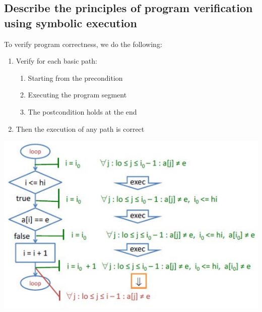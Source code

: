 \documentclass{article}
\begin{document}
\subsection{Describe the principles of program verification using symbolic execution}
\noindent To verify program correctness, we do the following:
\begin{enumerate}
    \item Verify for each basic path:
    \begin{enumerate}
        \item Starting from the precondition
        \item Executing the program segment
        \item The postcondition holds at the end

    \end{enumerate}
    \item Then the execution of any path is correct
\end{enumerate}
\begin{center}
  \includegraphics[scale=0.5]{image/23.PNG}  
\end{center}
\end{document}
